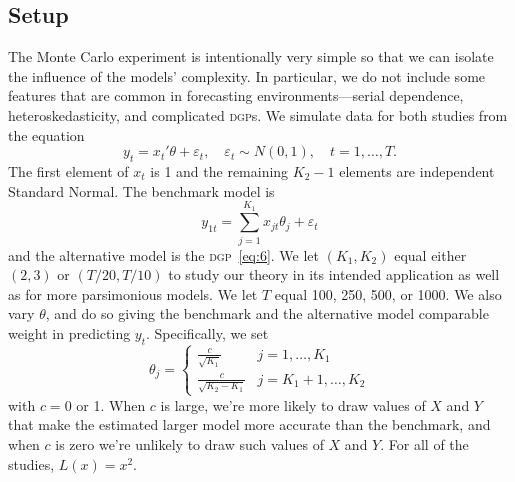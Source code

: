 \documentclass[11pt]{article}
\newcommand{\dgp}{\textsc{dgp}}
\begin{document}
\subsection{Setup}\label{sec:simulation-design}
The Monte Carlo experiment is intentionally very simple so that we can
isolate the influence of the models' complexity.  In particular, we do
not include some features that are common in forecasting
environments---serial dependence, heteroskedasticity, and complicated
\dgp s.  We simulate data for both studies from the equation
\begin{equation}\label{eq:6}
  y_t = x_t'\theta + \varepsilon_t,\quad \varepsilon_t \sim N(0,1),
  \quad t=1,\dots,T.
\end{equation}
The first element of $x_t$ is 1 and the remaining $K_2-1$ elements are
independent Standard Normal.  The benchmark model is
\begin{equation}
  \label{eq:1}
  y_{1t} = \sum_{j=1}^{K_1} x_{jt}\theta_j + \varepsilon_t
\end{equation}
and the alternative model is the \dgp\ \eqref{eq:6}.  We let
$(K_1,K_2)$ equal either $(2,3)$ or $(T/20,T/10)$ to study our theory
in its intended application as well as for more parsimonious models.
We let $T$ equal 100, 250, 500, or 1000.  We also vary $\theta$, and do 
so giving the benchmark and the alternative model comparable weight in
predicting $y_t$.  Specifically, we set
\begin{equation*}
  \theta_j = 
\begin{cases} \frac{c}{\sqrt{K_1}} & j = 1,\dots,K_1 \\
\frac{c}{\sqrt{K_2 - K_1}} & j = K_1 + 1,\dots,K_2 \end{cases}  
\end{equation*}
with $c=0$ or 1.  When $c$ is large, we're more likely to draw
values of $X$ and $Y$ that make the estimated larger model more
accurate than the benchmark, and when $c$ is zero we're unlikely to
draw such values of $X$ and $Y$.  For all of the studies, $L(x) =
x^2$.  
\end{document}
